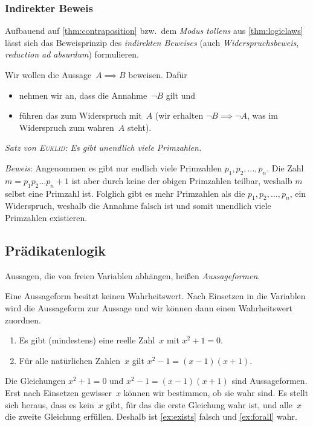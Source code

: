 \documentclass[a4paper]{article}
\begin{document}
\subsubsection{Indirekter Beweis}

Aufbauend auf \cref{thm:contraposition} bzw.\ dem \emph{Modus tollens} aus \cref{thm:logiclaws} lässt sich das Beweisprinzip des \emph{indirekten Beweises} (auch \emph{Widerspruchsbeweis}, \emph{reduction ad absurdum}) formulieren.

Wir wollen die Aussage~$A \implies B$ beweisen. Dafür
\begin{itemize}
    \item nehmen wir an, dass die Annahme~$\neg B$ gilt und
    \item führen das zum Widerspruch mit~$A$ (wir erhalten $\neg B \implies \neg A$, was im Widerspruch zum wahren~$A$ steht).
\end{itemize}

\begin{example}
    \emph{Satz von \textsc{Euklid}: Es gibt unendlich viele Primzahlen.}

    \emph{Beweis}: Angenommen es gibt nur endlich viele Primzahlen $p_1, p_2, \dots, p_n$. Die Zahl $m = p_1 p_2 \dots p_n + 1$ ist aber durch keine der obigen Primzahlen teilbar, weshalb $m$ selbst eine Primzahl ist. Folglich gibt es mehr Primzahlen als die $p_1, p_2, \dots, p_n$, ein Widerspruch, weshalb die Annahme falsch ist und somit unendlich viele Primzahlen existieren.
\end{example}

\subsection{Prädikatenlogik}

\begin{definition}[Aussageform]
    Aussagen, die von freien Variablen abhängen, heißen \emph{Aussageformen}.
\end{definition}

Eine Aussageform besitzt keinen Wahrheitswert. Nach Einsetzen in die Variablen wird die Aussageform zur Aussage und wir können dann einen Wahrheitswert zuordnen.

\begin{example}\label{ex:propformula}\leavevmode
    \begin{enumerate}
        \item Es gibt (mindestens) eine reelle Zahl~$x$ mit $x^2 + 1 = 0$.\label{ex:exists}
        \item Für alle natürlichen Zahlen~$x$ gilt $x^2 - 1 = (x - 1) (x + 1)$.\label{ex:forall}
    \end{enumerate}
    Die Gleichungen $x^2 + 1 = 0$ und $x^2 - 1 = (x - 1) (x + 1)$ sind Aussageformen. Erst nach Einsetzen gewisser~$x$ können wir bestimmen, ob sie wahr sind. Es stellt sich heraus, dass es kein~$x$ gibt, für das die erste Gleichung wahr ist, und alle~$x$ die zweite Gleichung erfüllen. Deshalb ist \cref{ex:exists} falsch und \cref{ex:forall} wahr.
\end{example}
\end{document}
